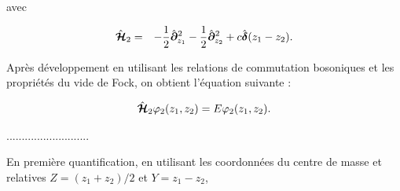 avec 

\begin{eqnarray}
	\hat{\bm{\mathcal{H}}}_2 & = &  - \frac{1}{2} \hat{\bm{\partial}}_{z_1}^2 - \frac{1}{2} \hat{\bm{\partial}}_{z_2}^2+ 	c  \hat{\bm{\delta}}(z_1 - z_2). \label{chap:1:hal.mod.2.part.3} 		
\end{eqnarray}


Après développement en utilisant les relations de commutation bosoniques et les propriétés du vide de Fock, on obtient l’équation suivante :

\begin{eqnarray}
	\hat{\bm{\mathcal{H}}}_2 \varphi_2(z_1, z_2) = E \varphi_2(z_1, z_2). \label{chap:eq.twobody}
\end{eqnarray}


...........................


En première quantification, en utilisant les coordonnées du centre de masse et relatives $Z = (z_1 + z_2)/2$ et $Y = z_1 - z_2$,

